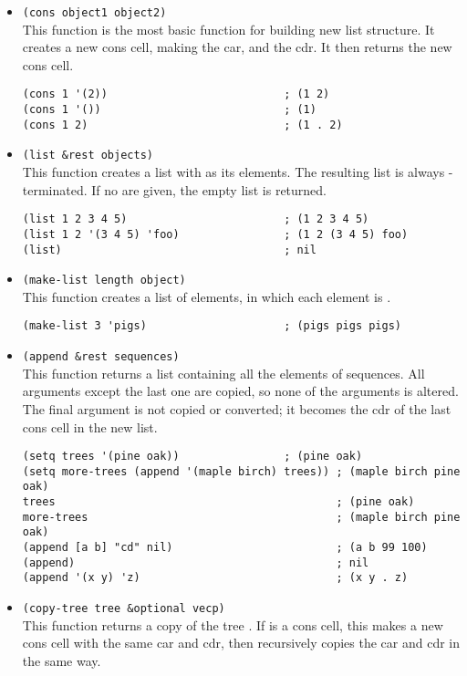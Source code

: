 \begin{itemize}
\item \lstinline|(cons object1 object2)|\\
  This function is the most basic function for building new list structure.
  It creates a new cons cell, making  the car, and  the cdr.
  It then returns the new cons cell.
\begin{lstlisting}
(cons 1 '(2))                           ; (1 2)
(cons 1 '())                            ; (1)
(cons 1 2)                              ; (1 . 2)
\end{lstlisting}
\item \lstinline|(list &rest objects)|\\
  This function creates a list with  as its elements.
  The resulting list is always -terminated.
  If no  are given, the empty list is returned.
\begin{lstlisting}
(list 1 2 3 4 5)                        ; (1 2 3 4 5)
(list 1 2 '(3 4 5) 'foo)                ; (1 2 (3 4 5) foo)
(list)                                  ; nil
\end{lstlisting}
\item \lstinline|(make-list length object)|\\
  This function creates a list of  elements, in which each element is .
\begin{lstlisting}
(make-list 3 'pigs)                     ; (pigs pigs pigs)
\end{lstlisting}
\item \lstinline|(append &rest sequences)|\\
  This function returns a list containing all the elements of sequences.
  All arguments except the last one are copied, so none of the arguments is altered.
  The final argument is not copied or converted; it becomes the cdr of the last cons cell in the new list.
\begin{lstlisting}
(setq trees '(pine oak))                ; (pine oak)
(setq more-trees (append '(maple birch) trees)) ; (maple birch pine oak)
trees                                           ; (pine oak)
more-trees                                      ; (maple birch pine oak)
(append [a b] "cd" nil)                         ; (a b 99 100)
(append)                                        ; nil
(append '(x y) 'z)                              ; (x y . z)
\end{lstlisting}
\item \lstinline|(copy-tree tree &optional vecp)|\\
  This function returns a copy of the tree .
  If  is a cons cell, this makes a new cons cell with the same car and cdr, then recursively copies the car and cdr in the same way.


\end{itemize}
